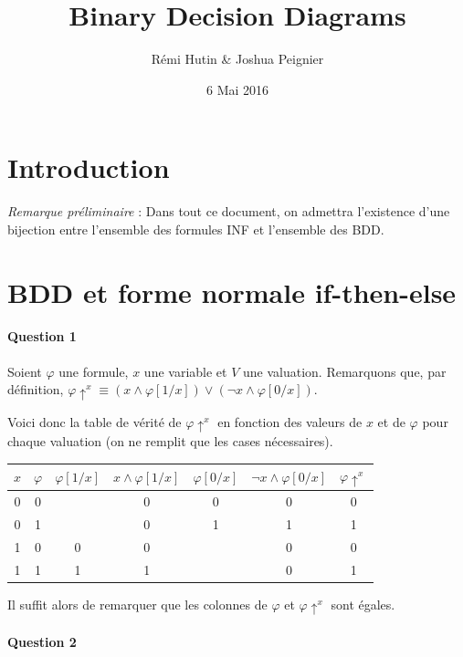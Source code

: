 \documentclass[a4paper,11pt]{article}
\title{Binary Decision Diagrams}
\author{Rémi Hutin \& Joshua Peignier}
\date{6 Mai 2016}
\begin{document}
\maketitle

	\section{Introduction}
	
	\emph{Remarque préliminaire} : Dans tout ce document, on admettra l'existence d'une bijection entre l'ensemble des formules INF et l'ensemble des BDD.
	 
	\section{BDD et forme normale if-then-else}

		\paragraph{Question 1}
		Soient $\varphi$ une formule, $x$ une variable et $V$ une valuation.\newline
		Remarquons que, par définition, $\varphi\uparrow^{x} \equiv (x \wedge \varphi[1/x]) \vee (\neg x \wedge \varphi[0/x])$.
		
		Voici donc la table de vérité de $\varphi\uparrow^{x}$ en fonction des valeurs de $x$ et de $\varphi$ pour chaque valuation (on ne remplit que les cases nécessaires).\newline
		
		\begin{tabular}{|c|c|c|c|c|c|c|}
		\hline
		$x$ & $\varphi$ & $\varphi[1/x]$ &  $x \wedge \varphi[1/x]$ & $\varphi[0/x]$ & $\neg x \wedge \varphi[0/x]$ & $\varphi\uparrow^{x}$ \\
		\hline
		0 & 0 &   & 0 & 0 & 0 & 0 \\
		\hline
		0 & 1 &   & 0 & 1 & 1 & 1 \\
		\hline
		1 & 0 & 0 & 0 &   & 0 & 0 \\
		\hline
		1 & 1 & 1 & 1 &   & 0 & 1 \\
		\hline
		\end{tabular}
		
		Il suffit alors de remarquer que les colonnes de $\varphi$ et $\varphi\uparrow^{x}$ sont égales.
		
		\paragraph{Question 2}
	
\end{document}
